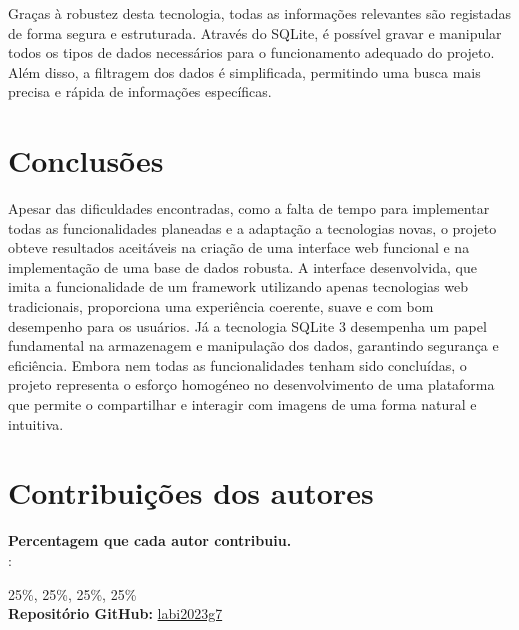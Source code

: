 \documentclass{report}
\begin{document}
Graças à robustez desta tecnologia, todas as informações relevantes são registadas de forma segura e estruturada. Através do SQLite, é possível gravar e manipular todos os tipos de dados necessários para o funcionamento adequado do projeto. Além disso, a filtragem dos dados é simplificada, permitindo uma busca mais precisa e rápida de informações específicas.

\chapter{Conclusões}
\label{chap.conclusao}
Apesar das dificuldades encontradas, como a falta de tempo para implementar todas as funcionalidades planeadas e a adaptação a tecnologias novas, o projeto obteve resultados aceitáveis na criação de uma interface web funcional e na implementação de uma base de dados robusta. A interface desenvolvida, que imita a funcionalidade de um framework utilizando apenas tecnologias web tradicionais, proporciona uma experiência coerente, suave e com bom desempenho para os usuários. Já a tecnologia SQLite 3 desempenha um papel fundamental na armazenagem e manipulação dos dados, garantindo segurança e eficiência. Embora nem todas as funcionalidades tenham sido concluídas, o projeto representa o esforço homogéneo no desenvolvimento de uma plataforma que permite o compartilhar e interagir com imagens de uma forma natural e intuitiva.

\chapter*{Contribuições dos autores}
\textbf{Percentagem que cada autor contribuiu.}\\

\autores : 

25\%, 25\%, 25\%, 25\%\\

\textbf{Repositório GitHub:} \href{https://github.com/detiuaveiro/projeto-final-labi2023g7/tree/updated}{labi2023g7}
\end{document}
